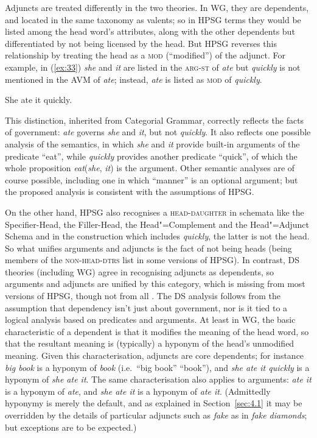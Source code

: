 \documentclass[output=paper
 	        ,biblatex
                ,babelshorthands
                ,newtxmath
                ,draftmode
                ,colorlinks, citecolor=brown
]{langscibook}
\begin{document}
Adjuncts are treated differently in the two theories. In WG, they are dependents, and located in the
same taxonomy as valents; so in HPSG terms they would be listed among the head word's attributes,
along with the other dependents but differentiated by not being licensed by the head. But HPSG
reverses this relationship by treating the head as a \textsc{mod} (``modified'') of the adjunct. For
example, in (\ref{ex:33}) \emph{she} and \emph{it} are listed in the \textsc{arg-st} of \emph{ate}
but \emph{quickly} is not mentioned in the AVM of \emph{ate}; instead, \emph{ate} is listed as
\textsc{mod} of \emph{quickly}.

\begin{exe}
	\ex \label{ex:33} She ate it quickly.
\end{exe}

\noindent
This distinction, inherited from Categorial Grammar, correctly reflects the facts of government:
\emph{ate} governs \emph{she} and \emph{it}, but not \emph{quickly}. It also reflects one possible
analysis of the semantics, in which \emph{she} and \emph{it} provide built-in arguments of the
predicate ``eat'', while \emph{quickly} provides another predicate ``quick'', of which the whole
proposition \emph{eat}(\emph{she}, \emph{it}) is the argument. Other semantic analyses are of course
possible, including one in which ``manner'' is an optional argument; but the proposed analysis is
consistent with the assumptions of HPSG.


On the other hand, HPSG also recognises a \textsc{head-daughter} in schemata like
the Specifier-Head, the Filler-Head, the Head"=Complement and the Head"=Adjunct Schema and in
the construction which includes \emph{quickly}, the latter is not the head. So what unifies
arguments and adjuncts is the fact of not being heads (being members of the \textsc{non-head-dtrs}
list in some versions of HPSG). In contrast, DS theories (including WG) agree
in recognising adjuncts as dependents, so arguments and adjuncts are unified by this category, which
is missing from most versions of HPSG, though not from all \citep*{BMS2001a}. The DS analysis follows
from the assumption that dependency isn't just about government, nor is it tied to a logical
analysis based on predicates and arguments. At least in WG, the basic characteristic of a dependent
is that it modifies the meaning of the head word, so that the resultant meaning is (typically) a
hyponym of the head's unmodified meaning. Given this characterisation, adjuncts are core dependents;
for instance \emph{big book} is a hyponym of \emph{book} (i.e.\ ``big book''  ``book''), and
\emph{she ate it quickly} is a hyponym of \emph{she ate it}. The same characterisation also applies
to arguments: \emph{ate it} is a hyponym of \emph{ate}, and \emph{she ate it} is a hyponym of
\emph{ate it}. (Admittedly hyponymy is merely the default, and as explained in Section~\ref{sec:4.1}
it may be overridden by the details of particular adjuncts such as \emph{fake} as in \emph{fake
  diamonds}; but exceptions are to be expected.)
\end{document}
